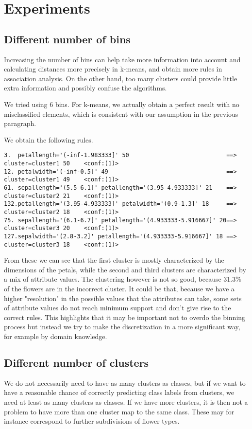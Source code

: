 \documentclass[]{article}
\begin{document}
\section{Experiments}

\subsection{Different number of bins}
Increasing the number of bins can help take more information into account and calculating distances more precisely in k-means, and obtain more rules in association analysis. On the other hand, too many clusters could provide little extra information and possibly confuse the algorithms. 

We tried using 6 bins. For k-means, we actually obtain a perfect result with no misclassified elements, which is consistent with our assumption in the previous paragraph.

We obtain the following rules. 
\begin{lstlisting}[breaklines=true]
3. 	petallength='(-inf-1.983333]' 50 							==> cluster=cluster1 50    <conf:(1)>
12. petalwidth='(-inf-0.5]' 49 									==> cluster=cluster1 49    <conf:(1)> 
61. sepallength='(5.5-6.1]' petallength='(3.95-4.933333]' 21 	==> cluster=cluster2 21    <conf:(1)>
132.petallength='(3.95-4.933333]' petalwidth='(0.9-1.3]' 18 	==> cluster=cluster2 18    <conf:(1)> 
75. sepallength='(6.1-6.7]' petallength='(4.933333-5.916667]' 20==> cluster=cluster3 20    <conf:(1)>
127.sepalwidth='(2.8-3.2]' petallength='(4.933333-5.916667]' 18 ==> cluster=cluster3 18    <conf:(1)>
\end{lstlisting}

From these we can see that the first cluster is mostly characterized by the dimensions of the petals, while the second and third clusters are characterized by a mix of attribute values. The clustering however is not so good, because 31.3\% of the flowers are in the incorrect cluster. It could be that, because we have a higher "resolution" in the possible values that the attributes can take, some sets of attribute values do not reach minimum support and don't give rise to the correct rules. This highlights that it may be important not to overdo the binning process but instead we try to make the discretization in a more significant way, for example by domain knowledge.

\subsection{Different number of clusters}
We do not necessarily need to have as many clusters as classes, but if we want to have a reasonable chance of correctly predicting class labels from clusters, we need at least as many clusters as classes. If we have more clusters, it is then not a problem to have more than one cluster map to the same class. These may for instance correspond to further subdivisions of flower types. 
\end{document}
